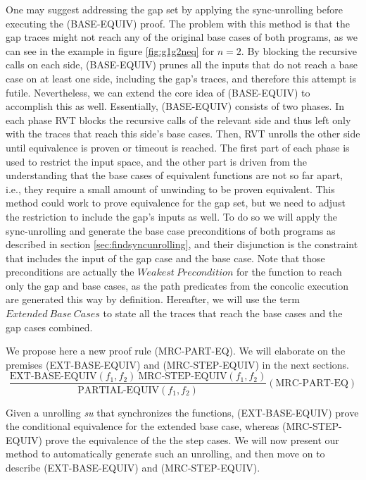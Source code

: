 One may suggest addressing the gap set by applying the sync-unrolling before executing the (BASE-EQUIV) proof. The problem with this method is that the gap traces might not reach any of the original base cases of both programs, as we can see in the example in figure \ref{fig:g1g2neq} for $n=2$. By blocking the recursive calls on each side, (BASE-EQUIV) prunes all the inputs that do not reach a base case on at least one side, including the gap's traces, and therefore this attempt is futile.
Nevertheless, we can extend the core idea of (BASE-EQUIV) to accomplish this as well. Essentially, (BASE-EQUIV) consists of two phases. In each phase RVT blocks the recursive calls of the relevant side and thus left only with the traces that reach this side's base cases. Then, RVT unrolls the other side until equivalence  is proven or timeout is reached. The first part of each phase is used to restrict the input space, and the other part is driven from the understanding that the base cases of equivalent functions are not so far apart, i.e., they require a small amount of unwinding to be proven equivalent. This method could work to prove equivalence for the gap set, but we need to adjust the restriction to include the gap's inputs as well. To do so we will apply the sync-unrolling and generate the base case preconditions of both programs as described in section \ref{sec:findsyncunrolling}, and their disjunction is the constraint that includes the input of the gap case and the base case. Note that those preconditions are actually the $Weakest\ Precondition$ \cite{10.1145/360933.360975} for the function to reach only the gap and base cases, as the path predicates from the concolic execution are generated this way by definition.
Hereafter, we will use the term $Extended\ Base\ Cases$ to state all the traces that reach the base cases and the gap cases combined. 

We propose here a new proof rule (MRC-PART-EQ). We will elaborate on the premises (EXT-BASE-EQUIV) and (MRC-STEP-EQUIV) in the next sections.
\begin{equation}
 {\frac {\text{EXT-BASE-EQUIV}(f_1,f_2) \:\text{MRC-STEP-EQUIV}(f_1,f_2)}{\text{PARTIAL-EQUIV}(f_1,f_2)}} 
  (\text{MRC-PART-EQ})
\end{equation}

Given a unrolling \emph{su} that synchronizes the functions, (EXT-BASE-EQUIV) prove the conditional equivalence for the extended base case, whereas (MRC-STEP-EQUIV) prove the equivalence of the the step cases. We will now present our method to automatically generate such an unrolling, and then move on to describe (EXT-BASE-EQUIV) and (MRC-STEP-EQUIV).



